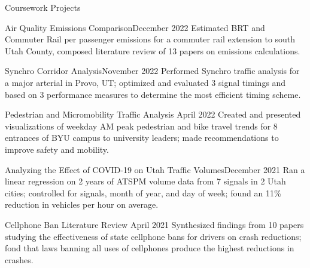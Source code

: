 \documentclass{resume} %
\begin{document}
\begin{rSection}{Coursework Projects}
\begin{pSubsection}{Air Quality Emissions Comparison}{December 2022}
{Estimated BRT and Commuter Rail per passenger emissions for a commuter rail extension to south Utah County, composed literature review of 13 papers on emissions calculations.}
\end{pSubsection}


\begin{pSubsection}{Synchro Corridor Analysis}{November 2022}
{Performed Synchro traffic analysis for a major arterial in Provo, UT; optimized and evaluated 3 signal timings and based on 3 performance measures to determine the most efficient timing scheme.}
\end{pSubsection}


\begin{pSubsection}{Pedestrian and Micromobility Traffic Analysis} {April 2022}
{Created and presented visualizations of weekday AM peak pedestrian and bike travel trends for 8 entrances of BYU campus to university leaders; made recommendations to improve safety and mobility.}
\end{pSubsection}


\begin{pSubsection}{Analyzing the Effect of COVID-19 on Utah Traffic Volumes}{December 2021}
{Ran a linear regression on 2 years of ATSPM volume data from 7 signals in 2 Utah cities; controlled for signals, month of year, and day of week; found an 11\% reduction in vehicles per hour on average.}
\end{pSubsection}


\begin{pSubsection}{Cellphone Ban Literature Review} {April 2021}
{Synthesized findings from 10 papers studying the effectiveness of state cellphone bans for drivers on crash reductions; fond that laws banning all uses of cellphones produce the highest reductions in crashes.}
\end{pSubsection}
\end{rSection}

\end{document}

